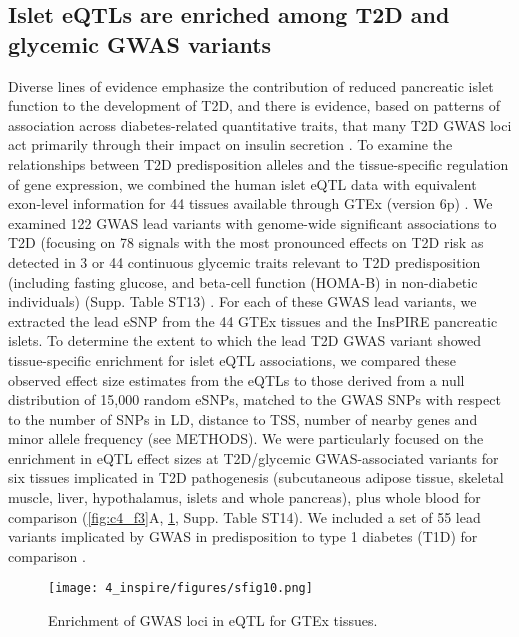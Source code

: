 \subsection{Islet eQTLs are enriched among T2D and glycemic GWAS variants}
Diverse lines of evidence emphasize the contribution of reduced pancreatic islet function to the development of T2D, and there is evidence, based on patterns of association across diabetes-related quantitative traits, that many T2D GWAS loci act primarily through their impact on insulin secretion \cite{mahajanFinemappingTypeDiabetes2018, mahajanRefiningAccuracyValidated2018, dimasImpactTypeDiabetes2014, thurnerIntegrationHumanPancreatic2018}. To examine the relationships between T2D predisposition alleles and the tissue-specific regulation of gene expression, we combined the human islet eQTL data with equivalent exon-level information for 44 tissues available through GTEx (version 6p) \cite{gtexconsortiumGeneticEffectsGene2017}.
We examined 122 GWAS lead variants with genome-wide significant associations to T2D (focusing on 78 signals with the most pronounced effects on T2D risk as detected in 3 or 44 continuous glycemic traits relevant to T2D predisposition (including fasting glucose, and beta-cell function (HOMA-B) in non-diabetic individuals) (Supp. Table ST13) \cite{scottLargescaleAssociationAnalyses2012, manningGenomewideApproachAccounting2012, strawbridgeGenomeWideAssociationIdentifies2011}. For each of these GWAS lead variants, we extracted the lead eSNP from the 44 GTEx tissues and the InsPIRE pancreatic islets. To determine the extent to which the lead T2D GWAS variant showed tissue-specific enrichment for islet eQTL associations, we compared these observed effect size estimates from the eQTLs to those derived from a null distribution of 15,000 random eSNPs, matched to the GWAS SNPs with respect to the number of SNPs in LD, distance to TSS, number of nearby genes and minor allele frequency (see METHODS). We were particularly focused on the enrichment in eQTL effect sizes at T2D/glycemic GWAS-associated variants for six tissues implicated in T2D pathogenesis (subcutaneous adipose tissue, skeletal muscle, liver, hypothalamus, islets and whole pancreas), plus whole blood for comparison (\ref{fig:c4_f3}A, \ref{fig:c4_sf_gwas_eqtl_enrich}, Supp. Table ST14). We included a set of 55 lead variants implicated by GWAS in predisposition to type 1 diabetes (T1D) for comparison \cite{onengut-gumuscuFineMappingType2015}.

\begin{figure}
    \centering
    \texttt{[image: 4\_inspire/figures/sfig10.png]}
    \caption[Enrichment of GWAS loci in eQTL for GTEx tissues]{Enrichment of GWAS loci in eQTL for GTEx tissues.}
    \label{fig:c4_sf_gwas_eqtl_enrich}
 \end{figure}
  
